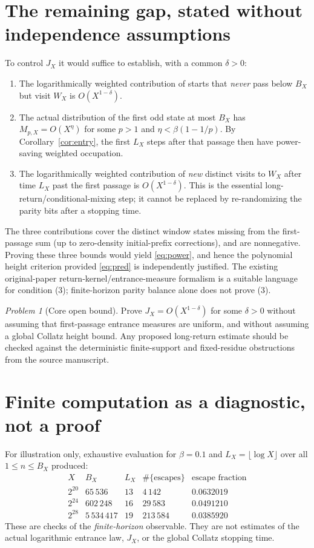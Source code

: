 \documentclass[11pt]{amsart}
\theoremstyle{remark}\newtheorem{remark}{Remark}
\newtheorem{problem}{Problem}
\begin{document}
\section{The remaining gap, stated without independence assumptions}
To control $J_X$ it would suffice to establish, with a common $\delta>0$:
\begin{enumerate}
\item The logarithmically weighted contribution of starts that \emph{never} pass below $B_X$ but visit $W_X$ is $O(X^{1-\delta})$.
\item The actual distribution of the first odd state at most $B_X$ has $M_{p,X}=O(X^\eta)$ for some $p>1$ and $\eta<\beta(1-1/p)$.  By Corollary~\ref{cor:entry}, the first $L_X$ steps after that passage then have power-saving weighted occupation.
\item The logarithmically weighted contribution of \emph{new} distinct visits to $W_X$ after time $L_X$ past the first passage is $O(X^{1-\delta})$.  This is the essential long-return/conditional-mixing step; it cannot be replaced by re-randomizing the parity bits after a stopping time.
\end{enumerate}
The three contributions cover the distinct window states missing from the first-passage sum (up to zero-density initial-prefix corrections), and are nonnegative.  Proving these three bounds would yield \eqref{eq:power}, and hence the polynomial height criterion provided \eqref{eq:pred} is independently justified.  The existing original-paper return-kernel/entrance-measure formalism is a suitable language for condition (3); finite-horizon parity balance alone does not prove (3).

\begin{problem}[Core open bound]
Prove $J_X=O(X^{1-\delta})$ for some $\delta>0$ without assuming that first-passage entrance measures are uniform, and without assuming a global Collatz height bound.  Any proposed long-return estimate should be checked against the deterministic finite-support and fixed-residue obstructions from the source manuscript.
\end{problem}

\section{Finite computation as a diagnostic, not a proof}
For illustration only, exhaustive evaluation for $\beta=0.1$ and $L_X=\lfloor\log X\rfloor$ over all $1\le n\le B_X$ produced:
\[
\begin{array}{c|r|r|r|c}
X&B_X&L_X&\#\{\text{escapes}\}&\text{escape fraction}\\\hline
2^{20}&65\,536&13&4\,142&0.0632019\\
2^{24}&602\,248&16&29\,583&0.0491210\\
2^{28}&5\,534\,417&19&213\,584&0.0385920
\end{array}
\]
These are checks of the \emph{finite-horizon} observable.  They are not estimates of the actual logarithmic entrance law, $J_X$, or the global Collatz stopping time.
\end{document}
